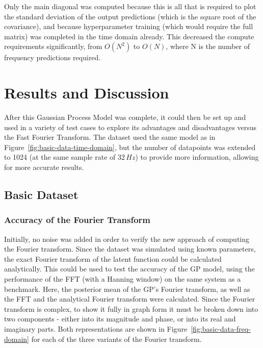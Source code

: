 \documentclass[12pt]{article}
\begin{document}
    Only the main diagonal was computed because this is all that is required to plot the standard deviation of the output predictions (which is the square root of the covariance), and because hyperparameter training (which would require the full matrix) was completed in the time domain already.
    This decreased the compute requirements significantly, from $O(N^2)$ to $O(N)$, where N is the number of frequency predictions required.

    \section{Results and Discussion}
    After this Gaussian Process Model was complete, it could then be set up and used in a variety of test cases to explore its advantages and disadvantages versus the Fast Fourier Transform.
    The dataset used the same model as in Figure~\ref{fig:basic-data-time-domain}, but the number of datapoints was extended to 1024 (at the same sample rate of $32 \, Hz$) to provide more information, allowing for more accurate results.

    \subsection{Basic Dataset}
    \subsubsection{Accuracy of the Fourier Transform} \label{Acc}
    Initially, no noise was added in order to verify the new approach of computing the Fourier transform.
    Since the dataset was simulated using known parameters, the exact Fourier transform of the latent function could be calculated analytically.
    This could be used to test the accuracy of the GP model, using the performance of the FFT (with a Hanning window) on the same system as a benchmark.
    Here, the posterior mean of the GP's Fourier transform, as well as the FFT and the analytical Fourier transform were calculated.
    Since the Fourier transform is complex, to show it fully in graph form it must be broken down into two components - either into its magnitude and phase, or into its real and imaginary parts.
    Both representations are shown in Figure~\ref{fig:basic-data-freq-domain} for each of the three variants of the Fourier transform.
\end{document}
